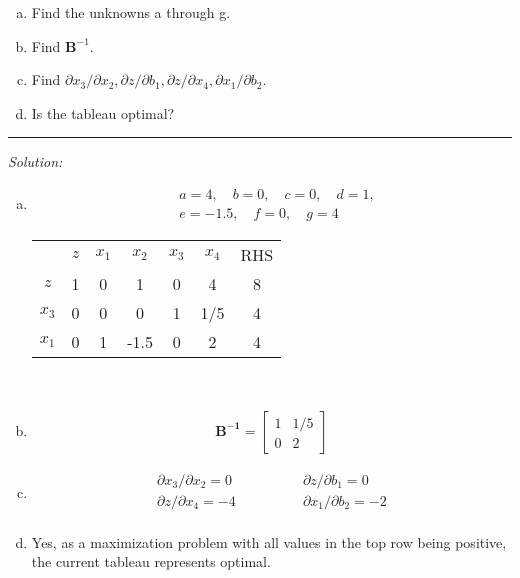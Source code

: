 \documentclass[12pt]{amsart}
\begin{document}
\begin{enumerate}[a.]
	\item Find the unknowns a through g.
	\item Find \(\mathbf B^{-1}\).
	\item Find \(\partial x_3/\partial x_2, \partial z/\partial b_1, \partial z/\partial x_4, \partial x_1/\partial b_2.\)
	\item Is the tableau optimal?
\end{enumerate}

\hrule
\medskip
\textit{Solution:}

\begin{enumerate}[a.]
	\item 
	\begin{align*} &
		a = 4, \quad
		b = 0, \quad
		c = 0, \quad
		d = 1, \\ &
		e = -1.5, \quad
		f = 0, \quad
		g = 4
	\end{align*}
	\begin{center}
		\setlength{\tabcolsep}{1em} %
		{\renewcommand{\arraystretch}{1.4}%
		\begin{tabular}{ccccccc}
			& $z$                    & $x_1$ & $x_2$ & $x_3$ & $x_4$                    & RHS                    \\ \cline{2-7} 
			\multicolumn{1}{c|}{$z$}   & \multicolumn{1}{c|}{1} & 0     & 1     & 0     & \multicolumn{1}{c|}{4}   & \multicolumn{1}{c|}{8} \\ \cline{2-7} 
			\multicolumn{1}{c|}{$x_3$} & \multicolumn{1}{c|}{0} & 0     & 0     & 1     & \multicolumn{1}{c|}{1/5} & \multicolumn{1}{c|}{4} \\
			\multicolumn{1}{c|}{$x_1$} & \multicolumn{1}{c|}{0} & 1     & -1.5  & 0     & \multicolumn{1}{c|}{2}   & \multicolumn{1}{c|}{4} \\ \cline{2-7} 
		\end{tabular}} \\
	\end{center}
	
	\item 
	\begin{align*}
		\mathbf{B^{-1}} = \begin{bmatrix} 1 & 1/5 \\ 0 & 2 \end{bmatrix}
	\end{align*}

	\item 
	\begin{align*}
		\partial x_3/\partial x_2 = 0 \qquad\qquad
		&\partial   z/\partial b_1 = 0 \\
		\partial   z/\partial x_4 = -4 \qquad\qquad
		&\partial x_1/\partial b_2 = -2 \\
	\end{align*}
	
	\item 
	Yes, as a maximization problem with all values in the top row being positive, 
	the current tableau represents optimal.

\end{enumerate}
\end{document}
